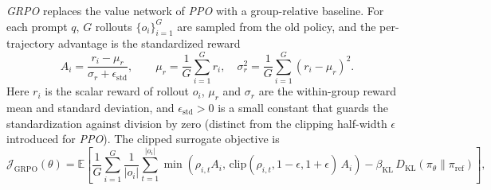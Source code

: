 \documentclass[a4paper,oneside,10pt,english]{scrbook}
\DeclareRobustCommand{\acfit}[1]{\textit{\ac{#1}}}
\begin{document}
\acfit{GRPO} \citep{deepseekmath} replaces the value network of \acfit{PPO} with a group-relative baseline. For each prompt $q$, $G$ rollouts $\{o_i\}_{i=1}^G$ are sampled from the old policy, and the per-trajectory advantage is the standardized reward
\begin{equation}
	A_i = \frac{r_i - \mu_r}{\sigma_r + \epsilon_{\mathrm{std}}}, \qquad \mu_r = \frac{1}{G}\sum_{i=1}^G r_i, \quad \sigma_r^2 = \frac{1}{G}\sum_{i=1}^G (r_i - \mu_r)^2.
\end{equation}
Here $r_i$ is the scalar reward of rollout $o_i$, $\mu_r$ and $\sigma_r$ are the within-group reward mean and standard deviation, and $\epsilon_{\mathrm{std}} > 0$ is a small constant that guards the standardization against division by zero (distinct from the clipping half-width $\epsilon$ introduced for \acfit{PPO}). The clipped surrogate objective is
\begin{equation}
	\mathcal{J}_{\mathrm{GRPO}}(\theta) = \mathbb{E}\!\left[\frac{1}{G}\sum_{i=1}^G \frac{1}{|o_i|}\sum_{t=1}^{|o_i|} \min\!\left(\rho_{i,t} A_i,\, \mathrm{clip}(\rho_{i,t}, 1-\epsilon, 1+\epsilon)\, A_i\right) - \beta_{\mathrm{KL}}\, D_{\mathrm{KL}}(\pi_\theta \| \pi_{\mathrm{ref}})\right],
\end{equation}
\end{document}
